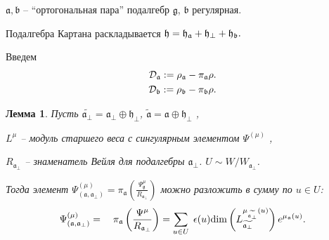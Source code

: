 \documentclass[pdftex]{beamer}
\newtheorem{mylemma}[theorem]{Лемма}
\newcommand{\gf}{\mathfrak{g}}
\newcommand{\af}{\mathfrak{a}}
\newcommand{\bff}{\mathfrak{b}}
\newcommand{\afb}{\mathfrak{a}_{\bot}}
\newcommand{\hf}{\mathfrak{h}}
\theoremstyle{definition} \newtheorem{Def}{Определение}
\begin{document}
\begin{frame}
  
$\af, \mathfrak{b}$ -- ``ортогональная пара'' подалгебр $\gf$, $\bff$ регулярная.

Подалгебра Картана раскладывается
$\frak{{h}=\frak{h}_{\af}+\frak{h}_{\bot}+\frak{h}_{\frak{b}}.}$

Введем
\begin{eqnarray*}
\mathcal{D}_{\af} :=\rho_{\af}-\pi_{\af}\rho.\\
\mathcal{D}_{\frak{b}} :=\rho_{\frak{b}}-\pi_{\frak{b}}\rho.
\end{eqnarray*}
\begin{mylemma}
\label{lemma}
Пусть  $\widetilde{\afb}=\afb\oplus \hf_{\perp }$, $\widetilde{\af}=\af\oplus\hf_{\perp }$ ,

$L^{\mu }$ -- модуль старшего веса с сингулярным элементом $\Psi ^{\left(\mu \right)}$ ,

$R_{\af_{\perp }}$ -- знаменатель Вейля для подалгебры $\af_{\perp }$. $U\sim W/W_{\afb}$.

Тогда элемент  $\Psi ^{\left( \mu \right) }_{\left(  \af, \afb \right)}=\pi _{\af}\left( \frac{\Psi _{\gf}^{\mu }}{R_{\af_{\perp }}}\right) $ можно разложить в сумму по  $u\in U$:
\begin{equation*}
\Psi ^{\left( \mu \right) }_{\left(  \af, \afb \right)}=\quad \pi _{\af}\left( \frac{\Psi^{\mu }}{R_{\af%
_{\perp }}}\right) =\sum_{u\in U}\;\epsilon (u)\mathrm{\dim }
\left( L_{\widetilde{\af_{\perp }}}^{\mu _{%
\widetilde{\af_{\perp }}}\left( u\right) }\right) e^{\mu _{\af}\left( u \right) }.
\end{equation*}
\end{mylemma}
\end{frame}
\end{document}
